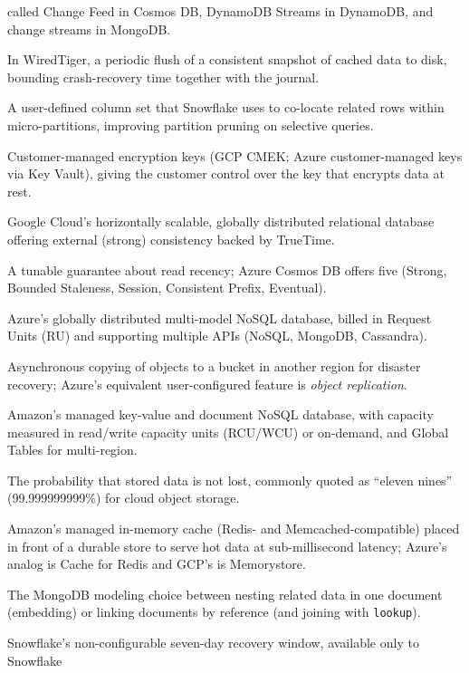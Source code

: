 \begin{description}
    called Change Feed in Cosmos DB, DynamoDB Streams in DynamoDB, and change streams in MongoDB.
  \item[Checkpoint] In WiredTiger, a periodic flush of a consistent snapshot of cached data to disk,
    bounding crash-recovery time together with the journal.
  \item[Clustering key] A user-defined column set that Snowflake uses to co-locate related rows within
    micro-partitions, improving partition pruning on selective queries.
  \item[CMEK / CMK] Customer-managed encryption keys (GCP CMEK; Azure customer-managed keys via Key
    Vault), giving the customer control over the key that encrypts data at rest.
  \item[Cloud Spanner] Google Cloud's horizontally scalable, globally distributed relational
    database offering external (strong) consistency backed by TrueTime.
  \item[Consistency level] A tunable guarantee about read recency; Azure Cosmos DB offers five
    (Strong, Bounded Staleness, Session, Consistent Prefix, Eventual).
  \item[Cosmos DB] Azure's globally distributed multi-model NoSQL database, billed in Request Units
    (RU) and supporting multiple APIs (NoSQL, MongoDB, Cassandra).
  \item[Cross-Region Replication (CRR)] Asynchronous copying of objects to a bucket in another region
    for disaster recovery; Azure's equivalent user-configured feature is \emph{object replication}.
  \item[DynamoDB] Amazon's managed key-value and document NoSQL database, with capacity measured in
    read/write capacity units (RCU/WCU) or on-demand, and Global Tables for multi-region.
  \item[Durability] The probability that stored data is not lost, commonly quoted as ``eleven nines''
    (99.999999999\%) for cloud object storage.
  \item[ElastiCache] Amazon's managed in-memory cache (Redis- and Memcached-compatible) placed in
    front of a durable store to serve hot data at sub-millisecond latency; Azure's analog is Cache
    for Redis and GCP's is Memorystore.
  \item[Embedding vs referencing] The MongoDB modeling choice between nesting related data in one
    document (embedding) or linking documents by reference (and joining with \texttt{lookup}).
  \item[Fail-safe] Snowflake's non-configurable seven-day recovery window, available only to Snowflake

\end{description}
